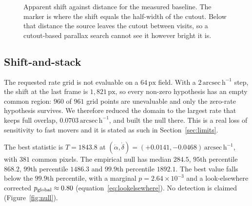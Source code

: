 \documentclass[11pt,a4paper]{article}
\newcommand{\unit}[1]{\,\mathrm{#1}}
\newcommand{\arcsec}{\unit{arcsec}}
\newcommand{\au}{\unit{AU}}
\newcommand{\px}{\unit{px}}
\begin{document}
\begin{figure}[htbp]
\centering
{}
\caption{Apparent shift against distance for the measured baseline. The marker is
where the shift equals the half-width of the cutout. Below that distance the
source leaves the cutout between visits, so a cutout-based parallax search cannot
see it however bright it is.}
\label{fig:reach}
\end{figure}

\subsection{Shift-and-stack}\label{sec:stack}
The requested rate grid is not evaluable on a $64\px$ field. With a
$2\arcsec\unit{h}^{-1}$ step, the shift at the last frame is $1{,}821\px$, so every
non-zero hypothesis has an empty common region: $960$ of $961$ grid points are
unevaluable and only the zero-rate hypothesis survives. We therefore reduced the
domain to the largest rate that keeps full overlap,
$0.0703\arcsec\unit{h}^{-1}$, and built the null there. This is a real loss of
sensitivity to fast movers and it is stated as such in
Section~\ref{sec:limits}.

The best statistic is $T = 1843.8$ at
$(\dot\alpha,\dot\delta) = (+0.0141,-0.0468)\arcsec\unit{h}^{-1}$, with $381$
common pixels. The empirical null has median $284.5$, $95$th percentile $868.2$,
$99$th percentile $1486.3$ and $99.9$th percentile $1892.1$. The best value falls
below the $99.9$th percentile, with a marginal $p = 2.64\times10^{-3}$ and a
look-elsewhere corrected $p_{\rm global}\approx0.80$
(equation~\ref{eq:lookelsewhere}). No detection is claimed
(Figure~\ref{fig:null}).
\end{document}
